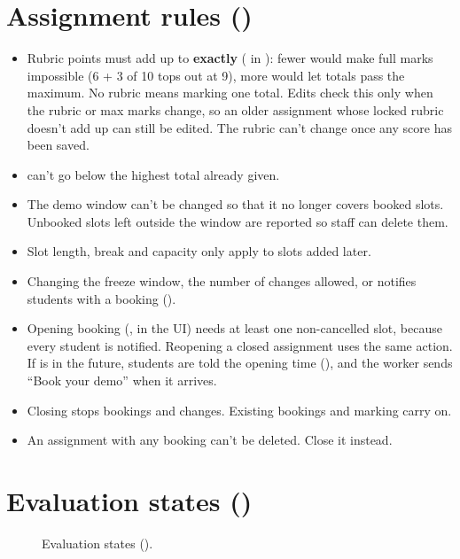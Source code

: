 \section[Assignment rules]{Assignment rules ()}

\begin{itemize}
  \item Rubric points must add up to \textbf{exactly}  ( in ): fewer would make full marks impossible (6 + 3 of 10 tops out at 9), more would let totals pass the maximum. No rubric means marking one total. Edits check this only when the rubric or max marks change, so an older assignment whose locked rubric doesn't add up can still be edited. The rubric can't change once any score has been saved.
  \item {} can't go below the highest total already given.
  \item The demo window can't be changed so that it no longer covers booked slots. Unbooked slots left outside the window are reported so staff can delete them.
  \item Slot length, break and capacity only apply to slots added later.
  \item Changing the freeze window, the number of changes allowed, or  notifies students with a booking ().
  \item Opening booking (,  in the UI) needs at least one non-cancelled slot, because every student is notified. Reopening a closed assignment uses the same action. If  is in the future, students are told the opening time (), and the worker sends ``Book your demo'' when it arrives.
  \item Closing stops bookings and changes. Existing bookings and marking carry on.
  \item An assignment with any booking can't be deleted. Close it instead.
\end{itemize}

\section[Evaluation states]{Evaluation states ()}

\begin{figure}[htbp]
  \centering
  
  \caption{Evaluation states ().}
  \label{fig:evaluation-states}
\end{figure}


